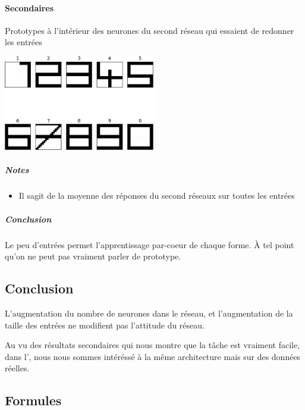     \paragraph{Secondaires}
      Prototypes à l'intérieur des neurones du second réseau qui essaient de redonner les entrées
      \begin{center}
	\includegraphics[width=250px]{data/expA2/prototype.png}
      \end{center} 
      \subparagraph{Notes}
	\begin{itemize}
	  \item Il sagit de la moyenne des réponses du second réseaux sur toutes les entrées
	\end{itemize}
      \subparagraph{Conclusion}
	Le peu d'entrées permet l'apprentissage par-coeur de chaque forme. À tel point qu'on ne peut pas vraiment
	parler de prototype.
	


  \subsection{Conclusion}
    L'augmentation du nombre de neurones dans le réseau, et l'augmentation de la taille des entrées
    ne modifient pas l'attitude du réseau.
    
    Au vu des résultats secondaires qui nous montre que la tâche est vraiment facile, dans l',
    nous nous sommes intéréssé à la même architecture mais sur des données réelles.
  

  \newpage 
  \subsection{Formules}
    
    
    



